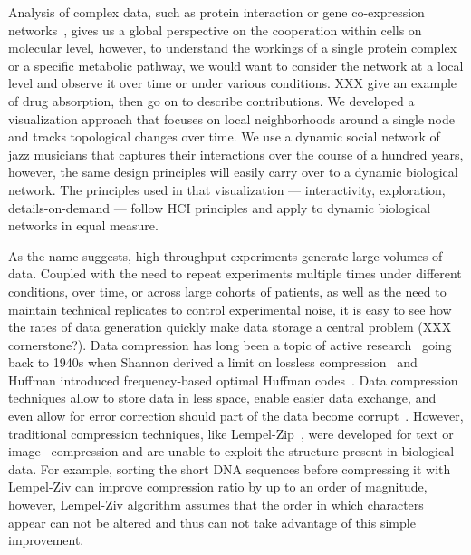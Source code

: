 
Analysis of complex data, such as protein interaction or gene co-expression networks~\cite{GSNs}, gives us a global perspective on the cooperation within cells on molecular level, however, to understand the workings of a single protein complex or a specific metabolic pathway, we would want to consider the network at a local level and observe it over time or under various conditions. 
XXX give an example of drug absorption, then go on to describe contributions. 
We developed a visualization approach that focuses on local neighborhoods around a single node and tracks topological changes over time. We use a dynamic social network of jazz musicians that captures their interactions over the course of a hundred years, however, the same design principles will easily carry over to a dynamic biological network. The principles used in that visualization --- interactivity, exploration, details-on-demand --- follow HCI principles and apply to dynamic biological networks in equal measure.


As the name suggests, high-throughput experiments generate large volumes of  data. Coupled with the need to repeat experiments multiple times under different conditions, over time, or across large cohorts of patients, as well as the need to maintain technical replicates to control experimental noise, it is easy to see how the rates of data generation quickly make data storage a central problem (XXX cornerstone?). Data compression has long been a topic of active research~\cite{CompressionReview} going back to 1940s when Shannon derived a limit on lossless compression~\cite{Shannon1948} and Huffman introduced frequency-based optimal Huffman codes~\cite{Huffman1952}. Data compression techniques allow to store data in less space, enable easier data exchange, and even allow for error correction should part of the data become corrupt~\cite{smth}. However, traditional compression techniques, like Lempel-Zip~\cite{LempelZiv}, were developed for text or image~\cite{GIF} compression and are unable to exploit the structure present in biological data. For example, sorting the short DNA sequences before compressing it with Lempel-Ziv can improve compression ratio by up to an order of magnitude, however, Lempel-Ziv algorithm assumes that the order in which characters appear can not be altered and thus can not take advantage of this simple improvement. 


